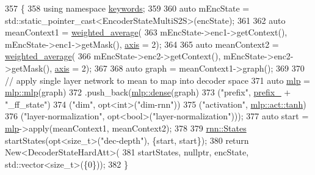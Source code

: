 \begin{DoxyCode}
357                                                                    \{
358     \textcolor{keyword}{using namespace }\hyperlink{namespacekeywords}{keywords};
359 
360     \textcolor{keyword}{auto} mEncState = std::static\_pointer\_cast<EncoderStateMultiS2S>(encState);
361 
362     \textcolor{keyword}{auto} meanContext1 = \hyperlink{namespacemarian_a8ccb9507a69a32ecd48410fd1557f209}{weighted\_average}(
363         mEncState->enc1->getContext(), mEncState->enc1->getMask(), \hyperlink{namespacemarian_1_1keywords_ace9158eabbddaca833133f12da98b9d6}{axis} = 2);
364 
365     \textcolor{keyword}{auto} meanContext2 = \hyperlink{namespacemarian_a8ccb9507a69a32ecd48410fd1557f209}{weighted\_average}(
366         mEncState->enc2->getContext(), mEncState->enc2->getMask(), \hyperlink{namespacemarian_1_1keywords_ace9158eabbddaca833133f12da98b9d6}{axis} = 2);
367 
368     \textcolor{keyword}{auto} graph = meanContext1->graph();
369 
370     \textcolor{comment}{// apply single layer network to mean to map into decoder space}
371     \textcolor{keyword}{auto} \hyperlink{namespacemarian_1_1mlp_a4d0fe240d31bdc33bcbdb5401de49e27}{mlp} = \hyperlink{namespacemarian_1_1mlp_a4d0fe240d31bdc33bcbdb5401de49e27}{mlp::mlp}(graph)
372                .push\_back(\hyperlink{namespacemarian_1_1mlp_a8c25b1e343bf78e66cd9e33e607efeb5}{mlp::dense}(graph)
373                           (\textcolor{stringliteral}{"prefix"}, \hyperlink{classmarian_1_1DecoderBase_a043a90801b6bda9a45e309607136e947}{prefix\_} + \textcolor{stringliteral}{"\_ff\_state"})
374                           (\textcolor{stringliteral}{"dim"}, opt<int>(\textcolor{stringliteral}{"dim-rnn"}))
375                           (\textcolor{stringliteral}{"activation"}, \hyperlink{namespacemarian_1_1mlp_ac16d27a877d16d7394f2057aee439d72a5c0dbba3a6ee4ac0eb26cfee75ccb8b4}{mlp::act::tanh})
376                           (\textcolor{stringliteral}{"layer-normalization"}, opt<bool>(\textcolor{stringliteral}{"layer-normalization"})));
377     \textcolor{keyword}{auto} start = \hyperlink{namespacemarian_1_1mlp_a4d0fe240d31bdc33bcbdb5401de49e27}{mlp}->apply(meanContext1, meanContext2);
378 
379     \hyperlink{namespaceamunmt_a4fe2912e208820f8217fbcf229ebacf7}{rnn::States} startStates(opt<size\_t>(\textcolor{stringliteral}{"dec-depth"}), \{start, start\});
380     \textcolor{keywordflow}{return} New<DecoderStateHardAtt>(
381         startStates, \textcolor{keyword}{nullptr}, encState, std::vector<size\_t>(\{0\}));
382   \}
\end{DoxyCode}


